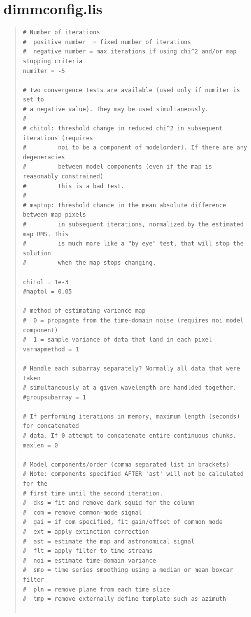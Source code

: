 \documentclass[twoside,11pt]{article}
\newcommand{\xlabel}[1]{}
\renewcommand{\_}{\texttt{\symbol{95}}}
\newenvironment{myquote}{\begin{quote}\begin{small}}{\end{small}\end{quote}}
\begin{document}
\section{\xlabel{defconfig}dimmconfig.lis}
\label{app:dimm}
\begin{myquote}
\begin{verbatim}
# Number of iterations
#  positive number  = fixed number of iterations
#  negative number = max iterations if using chi^2 and/or map stopping criteria
numiter = -5

# Two convergence tests are available (used only if numiter is set to
# a negative value). They may be used simultaneously.
#
# chitol: threshold change in reduced chi^2 in subsequent iterations (requires
#         noi to be a component of modelorder). If there are any degeneracies
#         between model components (even if the map is reasonably constrained)
#         this is a bad test.
#
# maptop: threshold chance in the mean absolute difference between map pixels
#         in subsequent iterations, normalized by the estimated map RMS. This
#         is much more like a "by eye" test, that will stop the solution
#         when the map stops changing.

chitol = 1e-3
#maptol = 0.05

# method of estimating variance map
#  0 = propagate from the time-domain noise (requires noi model component)
#  1 = sample variance of data that land in each pixel
varmapmethod = 1

# Handle each subarray separately? Normally all data that were taken
# simultaneously at a given wavelength are handlded together.
#groupsubarray = 1

# If performing iterations in memory, maximum length (seconds) for concatenated
# data. If 0 attempt to concatenate entire continuous chunks.
maxlen = 0

# Model components/order (comma separated list in brackets)
# Note: components specified AFTER 'ast' will not be calculated for the
# first time until the second iteration.
#  dks = fit and remove dark squid for the column
#  com = remove common-mode signal
#  gai = if com specified, fit gain/offset of common mode
#  ext = apply extinction correction
#  ast = estimate the map and astronomical signal
#  flt = apply filter to time streams
#  noi = estimate time-domain variance
#  smo = time series smoothing using a median or mean boxcar filter
#  pln = remove plane from each time slice
#  tmp = remove externally define template such as azimuth


\end{verbatim}
\end{myquote}
\end{document}
